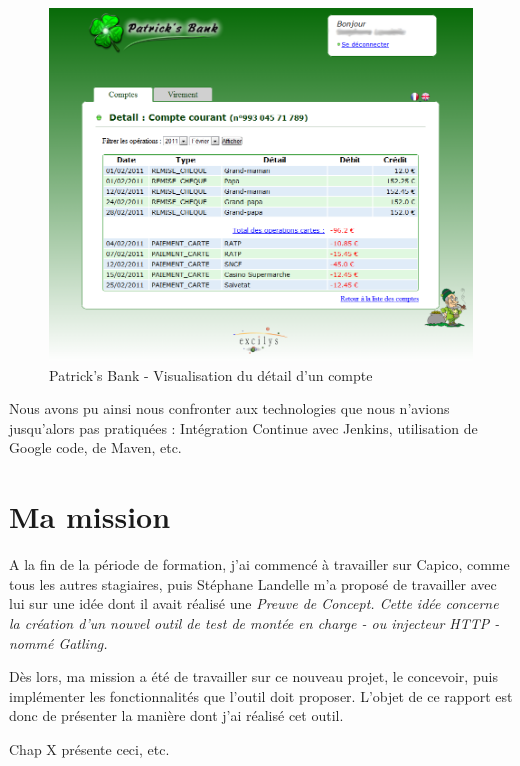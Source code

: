 \begin{figure}[h]
\begin{center}
\includegraphics[width=400pt]{img/patricks_bank.png}
\end{center}
\caption{Patrick's Bank - Visualisation du détail d'un compte}
\label{patricks_bank}
\end{figure}

Nous avons pu ainsi nous confronter aux technologies que nous n'avions jusqu'alors pas pratiquées : Intégration Continue avec Jenkins, utilisation de Google code, de Maven, etc. 

\section{Ma mission}
A la fin de la période de formation, j'ai commencé à travailler sur Capico, comme tous les autres stagiaires, puis Stéphane Landelle m'a proposé de travailler avec lui sur une idée dont il avait réalisé une \em{Preuve de Concept}. Cette idée concerne la création d'un nouvel outil de test de montée en charge - ou injecteur HTTP - nommé Gatling.

Dès lors, ma mission a été de travailler sur ce nouveau projet, le concevoir, puis implémenter les fonctionnalités que l'outil doit proposer. L'objet de ce rapport est donc de présenter la manière dont j'ai réalisé cet outil.

Chap X présente ceci, etc.